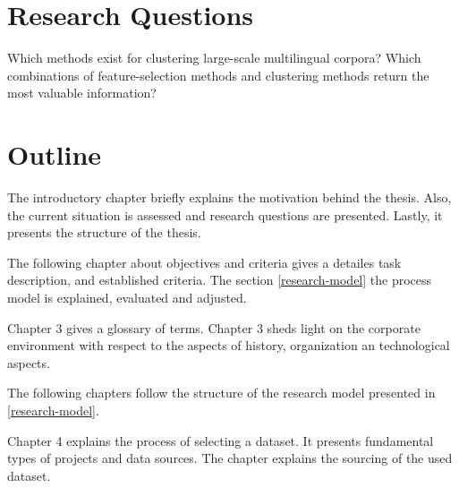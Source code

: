 \section{Research Questions}
Which methods exist for clustering large-scale multilingual corpora? Which combinations of feature-selection methods and clustering methods return the most valuable information?

\section{Outline}
The introductory chapter briefly explains the motivation behind the thesis. Also, the current situation is assessed and research questions are presented. Lastly, it presents the structure of the thesis.

The following chapter about objectives and criteria gives a detailes task description, and established criteria. The section \ref{research-model} the process model is explained, evaluated and adjusted.

Chapter 3 gives a glossary of terms. Chapter 3 sheds light on the corporate environment with respect to the aspects of history, organization an technological aspects. 

The following chapters follow the structure of the research model presented in \ref{research-model}.

Chapter 4 explains the process of selecting a dataset. It presents fundamental types of projects and data sources. The chapter explains the sourcing of the used dataset.